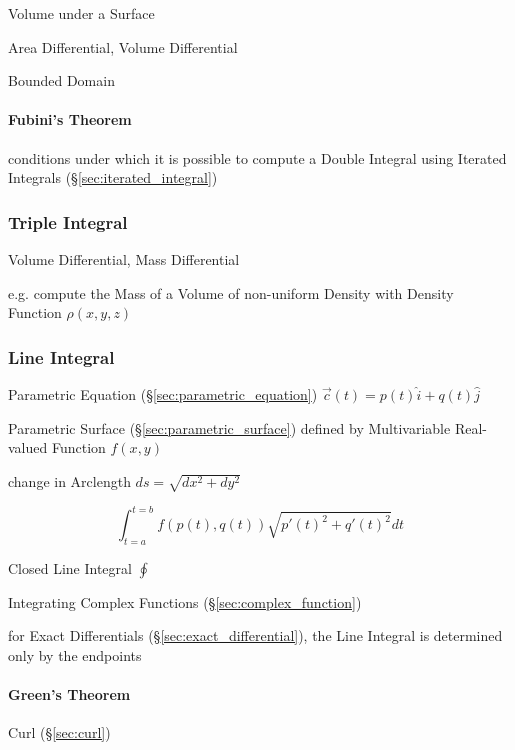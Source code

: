 Volume under a Surface

Area Differential, Volume Differential

Bounded Domain



\paragraph{Fubini's Theorem}\label{sec:fubinis_theorem}\hfill

conditions under which it is possible to compute a Double Integral using
Iterated Integrals (\S\ref{sec:iterated_integral})



\subsubsection{Triple Integral}\label{sec:triple_integral}

Volume Differential, Mass Differential

e.g. compute the Mass of a Volume of non-uniform Density with Density Function
$\rho(x,y,z)$



\subsubsection{Line Integral}\label{sec:line_integral}

Parametric Equation (\S\ref{sec:parametric_equation}) $\vec{c}(t) = p(t)\hat{i}
+ q(t)\hat{j}$

Parametric Surface (\S\ref{sec:parametric_surface}) defined by Multivariable
Real-valued Function $f(x,y)$

change in Arclength $ds = \sqrt{dx^2 + dy^2}$

\[
  \int_{t=a}^{t=b} f(p(t),q(t)) \sqrt{p'(t)^2 + q'(t)^2} dt
\]

Closed Line Integral $\oint$

Integrating Complex Functions (\S\ref{sec:complex_function})

for Exact Differentials (\S\ref{sec:exact_differential}), the Line Integral is
determined only by the endpoints



\paragraph{Green's Theorem}\label{sec:greens_theorem}\hfill

Curl (\S\ref{sec:curl})

